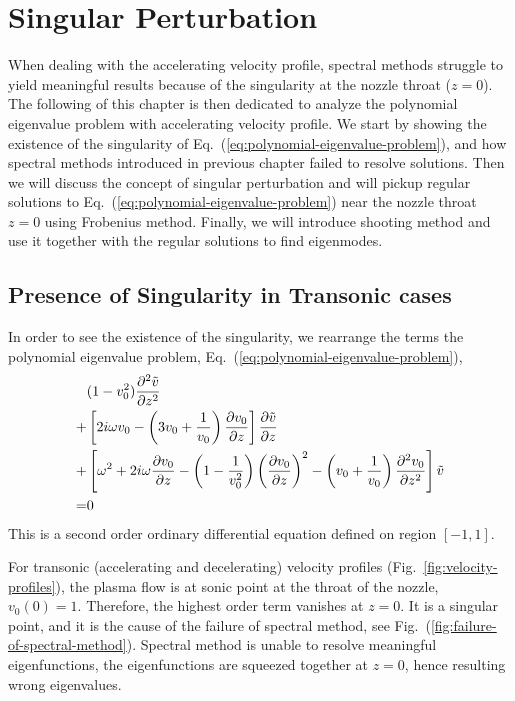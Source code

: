 \chapter{Singular Perturbation} \label{chap:singular-perturbation}
When dealing with the accelerating velocity profile, spectral methods struggle to yield meaningful results because of the singularity at the nozzle throat ($z=0$). The following of this chapter is then dedicated to analyze the polynomial eigenvalue problem with accelerating velocity profile. We start by showing the existence of the singularity of Eq.~(\ref{eq:polynomial-eigenvalue-problem}), and how spectral methods introduced in previous chapter failed to resolve solutions. Then we will discuss the concept of singular perturbation and will pickup regular solutions to Eq.~(\ref{eq:polynomial-eigenvalue-problem}) near the nozzle throat $z=0$ using Frobenius method. Finally, we will introduce shooting method and use it together with the regular solutions to find eigenmodes.

\section{Presence of Singularity in Transonic cases} \label{sec:presence-of-singularity}
In order to see the existence of the singularity, we rearrange the terms the polynomial eigenvalue problem, Eq.~(\ref{eq:polynomial-eigenvalue-problem}),
\begin{equation} \label{eq:singular-perturbation-problem}
	\begin{aligned}
		  & (1-v_0^2)\pdv[2]{\tilde{v}}{z}                                                                                                                                        \\
		+ & \left[2i\omega v_0 - \left(3v_0 + \frac{1}{v_0}\right)\pdv{v_0}{z}\right]\pdv{\tilde{v}}{z}                                                                           \\
		+ & \left[\omega^2 + 2i\omega\pdv{v_0}{z} -\left(1 - \frac{1}{v_0^2}\right)\left(\pdv{v_0}{z}\right)^2 - \left(v_0 + \frac{1}{v_0}\right)\pdv[2]{v_0}{z} \right]\tilde{v} \\
		= & 0
	\end{aligned}
\end{equation}
This is a second order ordinary differential equation defined on region $[-1,1]$.

For transonic (accelerating and decelerating) velocity profiles (Fig.~\ref{fig:velocity-profiles}), the plasma flow is at sonic point at the throat of the nozzle, $v_0(0)=1$. Therefore, the highest order term vanishes at $z=0$. It is a singular point, and it is the  cause of the failure of spectral method, see Fig.~(\ref{fig:failure-of-spectral-method}). Spectral method is unable to resolve meaningful eigenfunctions, the eigenfunctions are squeezed together at $z=0$, hence resulting wrong eigenvalues.

